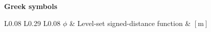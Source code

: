 \documentclass[letterpaper,times]{sae}
\begin{document}

\textbf{Greek symbols}

\begin{table}[h]
\centering
\begin{tabular}{L{0.08\textwidth} L{0.29\textwidth} L{0.08\textwidth}}
$\phi$   & Level-set signed-distance function & $[\mathrm{m}]$ \\
\end{tabular}
\end{table}
\end{document}
